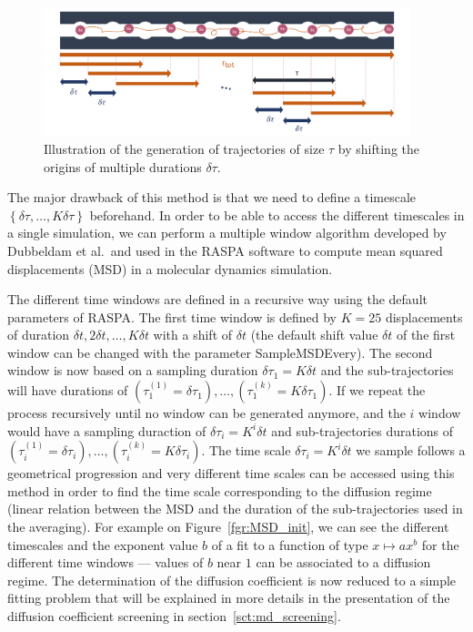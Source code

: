 \documentclass[main]{subfiles}
\begin{document}
\begin{figure}[ht]
  \centering
    \includegraphics[width=0.95\textwidth]{figures/5-diffusion/diffusion_averaging.pdf}
    \caption{Illustration of the generation of trajectories of size $\tau$ by shifting the origins of multiple durations $\delta\tau$. }\label{fgr:window_msd}
\end{figure}

The major drawback of this method is that we need to define a timescale $\left\{\delta\tau, \ldots, K\delta\tau\right\}$ beforehand. In order to be able to access the different timescales in a single simulation, we can perform a multiple window algorithm developed by Dubbeldam et al.\ and used in the RASPA software to compute mean squared displacements (MSD) in a molecular dynamics simulation.

The different time windows are defined in a recursive way using the default parameters of RASPA. The first time window is defined by $K=25$ displacements of duration $\delta t, 2\delta t, \ldots,K\delta t$ with a shift of $\delta t$ (the default shift value $\delta t$ of the first window can be changed with the parameter SampleMSDEvery). The second window is now based on a sampling duration $\delta \tau_1 = K\delta t$ and the sub-trajectories will have durations of $\left(\tau_1^{(1)} = \delta\tau_1\right),\ldots,\left(\tau_1^{(k)} = K\delta\tau_1\right)$. If we repeat the process recursively until no window can be generated anymore, and the $i$ window would have a sampling duraction of $\delta \tau_i = K^i\delta t$ and sub-trajectories durations of $\left(\tau_i^{(1)} = \delta\tau_i\right),\ldots,\left(\tau_i^{(k)} = K\delta\tau_i\right)$. The time scale $\delta \tau_i = K^i\delta t$ we sample follows a geometrical progression and very different time scales can be accessed using this method in order to find the time scale corresponding to the diffusion regime (linear relation between the MSD and the duration of the sub-trajectories used in the averaging). For example on Figure~\ref{fgr:MSD_init}, we can see the different timescales and the exponent value $b$ of a fit to a function of type $x \mapsto ax^b$ for the different time windows --- values of $b$ near $1$ can be associated to a diffusion regime. The determination of the diffusion coefficient is now reduced to a simple fitting problem that will be explained in more details in the presentation of the diffusion coefficient screening in section~\ref{sct:md_screening}.
\end{document}
